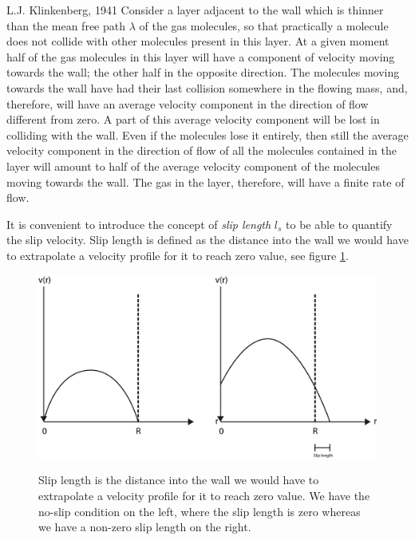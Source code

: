\begin{aquote}{L.J. Klinkenberg, 1941}
Consider a layer adjacent to the wall which is thinner than the mean free path $\lambda$ of the gas molecules, so that practically a molecule does not collide with other molecules present in this layer. At a given moment half of the gas molecules in this layer will have a component of velocity moving towards the wall; the other half in the opposite direction. The molecules moving towards the wall have had their last collision somewhere in the flowing mass, and, therefore, will have an average velocity component in the direction of flow different from zero. A part of this average velocity component will be lost in colliding with the wall. Even if the molecules lose it entirely, then still the average velocity component in the direction of flow of all the molecules contained in the layer will amount to half of the average velocity component of the molecules moving towards the wall. The gas in the layer, therefore, will have a finite rate of flow.
\end{aquote}
It is convenient to introduce the concept of \textit{slip length} $l_s$ to be able to quantify the slip velocity. Slip length is defined as the distance into the wall we would have to extrapolate a velocity profile for it to reach zero value, see figure \ref{fig:slip_length}.
\begin{figure}[h]
\begin{center}
\includegraphics[width=\textwidth, trim=0cm 0cm 0cm 0cm, clip]{DSMC/figures/slip_length.eps}
\label{fig:slip_length}
\end{center}
\caption{Slip length is the distance into the wall we would have to extrapolate a velocity profile for it to reach zero value. We have the no-slip condition on the left, where the slip length is zero whereas we have a non-zero slip length on the right.}
\end{figure}
